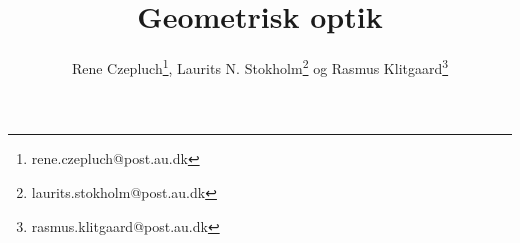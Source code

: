 \documentclass[danish,a4paper,twocolumn, oneside]{memoir}
\title{Geometrisk optik}
\author{Rene Czepluch\thanks{rene.czepluch@post.au.dk}, Laurits N. Stokholm\thanks{laurits.stokholm@post.au.dk} og Rasmus Klitgaard\thanks{rasmus.klitgaard@post.au.dk}}
\date{}
\begin{document}
\newcommand{\forsogEt}{forsøg 1, afbildning med én samlelinse}
\newcommand{\forsogTo}{forsøg 2, forstørrelsesglas}

\maketitle
\noindent







\end{document}
